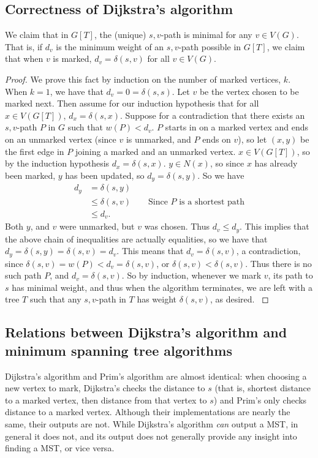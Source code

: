 \documentclass[11pt]{article}
\begin{document}
\subsection{Correctness of Dijkstra's algorithm}

We claim that in $G[T]$, the (unique) $s,v$-path is minimal for any $v\in V(G)$.
That is, if $d_v$ is the minimum weight of an $s,v$-path possible in $G[T]$, we claim that when $v$ is marked, $d_v=\delta(s,v)$ for all $v\in V(G)$.
\begin{proof}
	We prove this fact by induction on the number of marked vertices, $k$.
	When $k=1$, we have that $d_v=0=\delta(s,s)$.
	Let $v$ be the vertex chosen to be marked next.
	Then assume for our induction hypothesis that for all $x\in V(G[T])$, $d_x=\delta(s,x)$.
	Suppose for a contradiction that there exists an $s,v$-path $P$ in $G$  such that $w(P)<d_v$.
	$P$ starts in on a marked vertex and ends on an unmarked vertex (since $v$ is unmarked, and $P$ ends on $v$), so let $(x,y)$ be the first edge in $P$ joining a marked and an unmarked vertex.
	$x\in V(G[T])$, so by the induction hypothesis $d_x=\delta(s,x)$.
	$y\in N(x)$, so since $x$ has already been marked, $y$ has been updated, so $d_y=\delta(s,y)$.
	So we have
	\begin{align*}
		d_y&=\delta(s,y)\\
		&\le\delta(s,v)\qquad\text{Since $P$ is a shortest path}\\
		&\le d_v.
	\end{align*}
	Both $y$, and $v$ were unmarked, but $v$ was chosen.
	Thus $d_v\le d_y$.
	This implies that the above chain of inequalities are actually equalities, so we have that $d_y=\delta(s,y)=\delta(s,v)=d_v$.
	This means that $d_v=\delta(s,v)$, a contradiction, since $\delta(s,v)=w(P)<d_v=\delta(s,v)$, or $\delta(s,v)<\delta(s,v)$.
	Thus there is no such path $P$, and $d_v=\delta(s,v)$.
	So by induction, whenever we mark $v$, its path to $s$ has minimal weight, and thus when the algorithm terminates, we are left with a tree $T$ such that any $s,v$-path in $T$ has weight $\delta(s,v)$, as desired. \cite{Dijkstra} \cite{CLRS}
\end{proof}


\subsection{Relations between Dijkstra's algorithm and minimum spanning tree algorithms}

Dijkstra's algorithm and Prim's algorithm are almost identical: when choosing a new vertex to mark, Dijkstra's checks the distance to $s$ (that is, shortest distance to a marked vertex, then distance from that vertex to $s$) and Prim's only checks distance to a marked vertex.
Although their implementations are nearly the same, their outputs are not. While Dijkstra's algorithm \textit{can} output a MST, in general it does not, and its output does not generally provide any insight into finding a MST, or vice versa.
\end{document}
